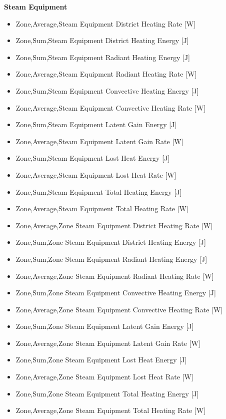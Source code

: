 \textbf{Steam Equipment}

\begin{itemize}
\item
  Zone,Average,Steam Equipment District Heating Rate {[}W{]}
\item
  Zone,Sum,Steam Equipment District Heating Energy {[}J{]}
\item
  Zone,Sum,Steam Equipment Radiant Heating Energy {[}J{]}
\item
  Zone,Average,Steam Equipment Radiant Heating Rate {[}W{]}
\item
  Zone,Sum,Steam Equipment Convective Heating Energy {[}J{]}
\item
  Zone,Average,Steam Equipment Convective Heating Rate {[}W{]}
\item
  Zone,Sum,Steam Equipment Latent Gain Energy {[}J{]}
\item
  Zone,Average,Steam Equipment Latent Gain Rate {[}W{]}
\item
  Zone,Sum,Steam Equipment Lost Heat Energy {[}J{]}
\item
  Zone,Average,Steam Equipment Lost Heat Rate {[}W{]}
\item
  Zone,Sum,Steam Equipment Total Heating Energy {[}J{]}
\item
  Zone,Average,Steam Equipment Total Heating Rate {[}W{]}
\item
  Zone,Average,Zone Steam Equipment District Heating Rate {[}W{]}
\item
  Zone,Sum,Zone Steam Equipment District Heating Energy {[}J{]}
\item
  Zone,Sum,Zone Steam Equipment Radiant Heating Energy {[}J{]}
\item
  Zone,Average,Zone Steam Equipment Radiant Heating Rate {[}W{]}
\item
  Zone,Sum,Zone Steam Equipment Convective Heating Energy {[}J{]}
\item
  Zone,Average,Zone Steam Equipment Convective Heating Rate {[}W{]}
\item
  Zone,Sum,Zone Steam Equipment Latent Gain Energy {[}J{]}
\item
  Zone,Average,Zone Steam Equipment Latent Gain Rate {[}W{]}
\item
  Zone,Sum,Zone Steam Equipment Lost Heat Energy {[}J{]}
\item
  Zone,Average,Zone Steam Equipment Lost Heat Rate {[}W{]}
\item
  Zone,Sum,Zone Steam Equipment Total Heating Energy {[}J{]}
\item
  Zone,Average,Zone Steam Equipment Total Heating Rate {[}W{]}
\end{itemize}

